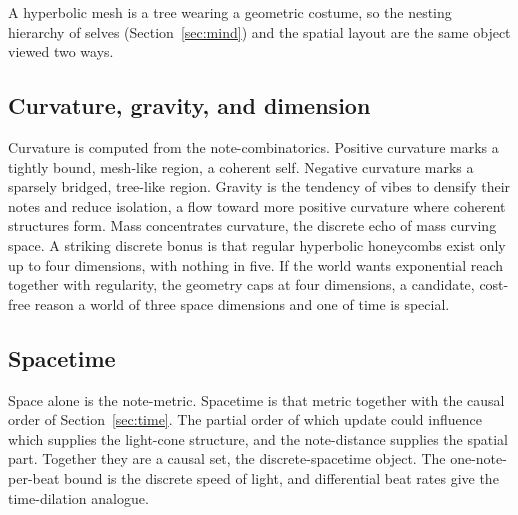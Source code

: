 A hyperbolic mesh is a tree wearing a geometric costume, so the nesting hierarchy of selves (Section~\ref{sec:mind}) and the spatial layout are the same object viewed two ways.

\subsection{Curvature, gravity, and dimension}

Curvature is computed from the note-combinatorics. Positive curvature marks a tightly bound, mesh-like region, a coherent self. Negative curvature marks a sparsely bridged, tree-like region. Gravity is the tendency of vibes to densify their notes and reduce isolation, a flow toward more positive curvature where coherent structures form. Mass concentrates curvature, the discrete echo of mass curving space. A striking discrete bonus is that regular hyperbolic honeycombs exist only up to four dimensions, with nothing in five. If the world wants exponential reach together with regularity, the geometry caps at four dimensions, a candidate, cost-free reason a world of three space dimensions and one of time is special.

\subsection{Spacetime}

Space alone is the note-metric. Spacetime is that metric together with the causal order of Section~\ref{sec:time}. The partial order of which update could influence which supplies the light-cone structure, and the note-distance supplies the spatial part. Together they are a causal set, the discrete-spacetime object. The one-note-per-beat bound is the discrete speed of light, and differential beat rates give the time-dilation analogue.
